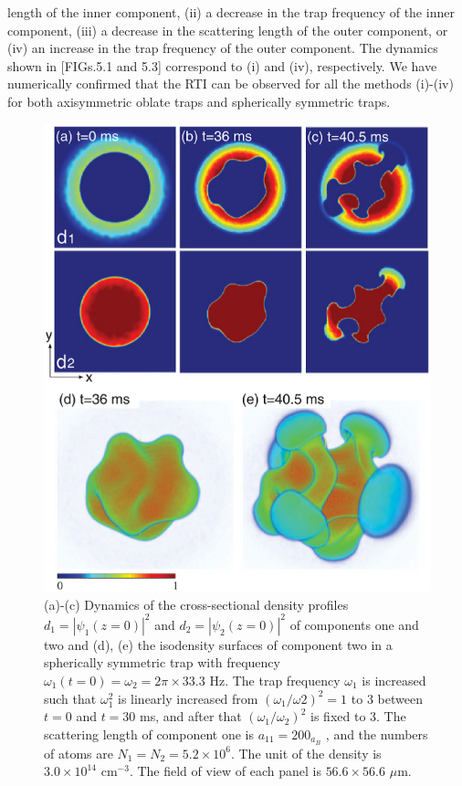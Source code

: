 \documentclass[12pt,a4paper]{report}
\begin{document}
length of the inner component, (ii) a decrease in the trap
frequency of the inner component, (iii) a decrease in the
scattering length of the outer component, or (iv) an increase
in the trap frequency of the outer component. The dynamics
shown in [FIGs.5.1 and 5.3] correspond to (i) and (iv), respectively.
We have numerically confirmed that the RTI can be observed
for all the methods (i)-(iv) for both axisymmetric oblate traps
and spherically symmetric traps.
\begin{figure}[htbp]
\begin{center}
\includegraphics[scale=0.5,keepaspectratio]{5-3.eps}
\caption{(a)-(c) Dynamics of the cross-sectional
density profiles $d_1 = | \psi_1 (z=0) |^2$ and $d_2 = | \psi_2 (z=0) |^2$ of components
one and two and (d), (e) the isodensity surfaces of component
two in a spherically symmetric trap with frequency $\omega_1(t=0)= \omega_2 = 2 \pi \times 33.3 $ Hz.
The trap frequency $\omega_1$ is increased such that $\omega_1^2$
is linearly increased from $(\omega_1 / \omega2)^2 = 1$ to $3$ between $t=0$ and
$t=30$ ms, and after that $(\omega_1/\omega_2)^2$ is fixed to $3$. The scattering length
of component one is $a_{11} = 200_{a_B}$ , and the numbers of atoms are
$N_1 = N_2 = 5.2 \times 10^6$. The unit of the density is $3.0 \times 10^{14}$ cm$^{-3}$.
The field of view of each panel is $56.6 \times 56.6$ $\mu$m.}
\label{FIG:5-3}
\end{center}
\end{figure}
\end{document}
